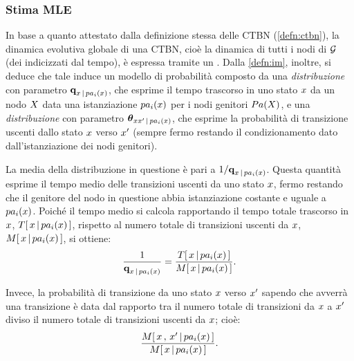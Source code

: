 \subsubsection{Stima \acl{MLE}}\label{subsec:ctbn-mle-params}
In base a quanto attestato dalla definizione stessa delle \acs{CTBN} (\vref{defn:ctbn}), la dinamica evolutiva globale di una \acs{CTBN}, cioè la dinamica di tutti i nodi di $\mathcal{G}$ (dei \mprocess{} \cond{} indicizzati dal tempo), è espressa tramite un \mprocess*{} \omog*{}. Dalla \autoref{defn:im}, inoltre, si deduce che tale \mprocess*{} induce un modello di probabilità composto da una \emph{distribuzione } con parametro $\boldsymbol{\textbf{\text{q}}}_{x\,\arrowvert\,pa_i(\mathnormal{x})}$, che esprime il tempo trascorso in uno stato $\mathnormal{x}$ da un nodo $\mathnormal{X}$ data una istanziazione $pa_i(\mathnormal{x})$ per i nodi genitori $Pa(\mathnormal{X})$, e una \emph{distribuzione } con parametro $\boldsymbol{\textbf{\text{$\theta$}}}_{\mathnormal{x}\mathnormal{x}^\prime\,\arrowvert\,pa_i(\mathnormal{x})}$, che esprime la probabilità di transizione uscenti dallo stato $\mathnormal{x}$ verso $\mathnormal{x}^\prime$ (sempre fermo restando il condizionamento dato dall'istanziazione dei nodi genitori).

La media della distribuzione  in questione è pari a $1/\boldsymbol{\textbf{\text{q}}}_{\mathnormal{x}\,\arrowvert\,pa_i(\mathnormal{x})}$. Questa quantità esprime il tempo medio delle transizioni uscenti da uno stato $\mathnormal{x}$, fermo restando che il genitore del nodo in questione abbia istanziazione costante e uguale a $pa_i(\mathnormal{x})$. Poiché il tempo medio si calcola rapportando il tempo totale trascorso in $\mathnormal{x}$, $T[\,\mathnormal{\mathnormal{x}\,\arrowvert\,pa_i(\mathnormal{x})}\,]$, rispetto al numero totale di transizioni uscenti da $\mathnormal{x}$, $\mstat{x\,\arrowvert\,pa_i(\setel{x})}$, si ottiene:
\[
\frac{1}{\param{q}_{\setel{x}\,\arrowvert\,pa_i(\setel{x})}}=\frac{\tstat{x\,\arrowvert\,pa_i(\setel{x})}}{\mstat{x\,\arrowvert\,pa_i(\setel{x})}}\text{.}
\]

Invece, la probabilità di transizione da uno stato $\mathnormal{x}$ verso $\mathnormal{x}^\prime$ sapendo che avverrà una transizione è data dal rapporto tra il numero totale di transizioni da $\mathnormal{x}$ a $\mathnormal{x}^\prime$ diviso il numero totale di transizioni uscenti da $\mathnormal{x}$; cioè:
\[
\frac{\mstat[x]{\setel{x}^\prime\,\arrowvert\,pa_i(\setel{x})}}{\mstat{\setel{x}\,\arrowvert\,pa_i(\setel{x})}}\text{.}
\]

